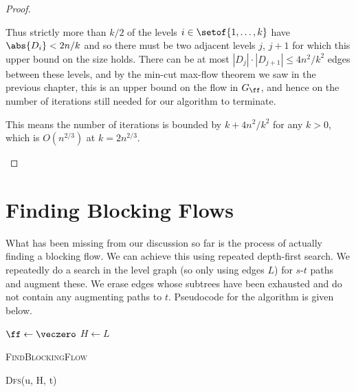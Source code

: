 \begin{proof}
\begin{enumerate}
    Thus strictly more than $k/2$ of the levels $i \in \setof{1,\ldots,k}$
    have $\abs{D_i} < 2n/k$ and so there must be two adjacent levels $j$, $j+1$
    for which this upper bound on the size holds.
    There can be at most
    $|D_j|\cdot|D_{j+1}| \leq 4n^2/k^2$ edges between these levels, and by the min-cut
    max-flow theorem we saw in the previous chapter, this is an upper bound on the flow
    in $G_{\ff}$, and hence on the number of iterations still needed for our algorithm to
    terminate.

    This means the number of iterations is bounded by $k + 4n^2/k^2$ for any $k>0$,
    which is $O(n^{2/3})$ at $k=2n^{2/3}$.
  \end{enumerate}
\end{proof}

\section{Finding Blocking Flows}
 \label{sec:findBlockingFlows} 
What has been missing from our discussion so far is the process of actually finding a blocking flow.
We can achieve this using repeated depth-first search. We repeatedly do a search in the level graph (so
only using edges $L$) for $s$-$t$ paths and augment these. We erase edges whose subtrees have been
exhausted and do not contain any augmenting paths to $t$. Pseudocode for the algorithm is given below.

\begin{algorithm}[H]
  \SetAlgoLined
  $\ff \leftarrow \veczero$\;
  $H \leftarrow L$\;
  \caption{\textsc{FindBlockingFlow}}
\end{algorithm}

\begin{algorithm}[H]
  \SetAlgoLined
  \Return{$\emptyset$}\;
  \caption{\textsc{Dfs}(u, H, t)}
\end{algorithm}

